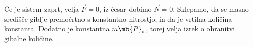 
Če je sistem zaprt, velja $\vec{F} = 0$, iz česar dobimo $\vec{N} = 0$.
Sklepamo, da se masno središče giblje premočrtno s konstantno hitrostjo, in da
je vrtilna količina konstanta.
Dodatno je konstantna $m \dot{\mb{P}}_*$, torej velja izrek o ohranitvi gibalne
količine.